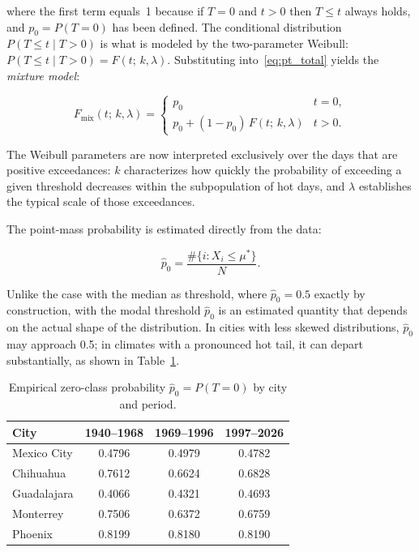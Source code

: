 \documentclass[APA,STIX1COL]{WileyNJD-v2}
\begin{document}
\medskip

where the first term equals~1 because if $T=0$ and $t>0$ then
$T\leq t$ always holds, and $p_0=P(T=0)$ has been defined. The
conditional distribution $P(T\leq t\mid T>0)$ is what is modeled
by the two-parameter Weibull: $P(T\leq t\mid T>0)=F(t;\,k,\lambda)$.
Substituting into~\eqref{eq:pt_total} yields the \emph{mixture
model}:

\begin{equation}\label{eq:mezcla}
F_{\mathrm{mix}}(t;\,k,\lambda)
  = \begin{cases}
    p_0 & t=0,\\[6pt]
    p_0 + (1-p_0)\,F(t;\,k,\lambda) & t>0.
    \end{cases}
\end{equation}

\medskip

The Weibull parameters are now interpreted exclusively over the
days that are positive exceedances: $k$ characterizes how quickly
the probability of exceeding a given threshold decreases within
the subpopulation of hot days, and $\lambda$ establishes the
typical scale of those exceedances.

\medskip

The point-mass probability is estimated directly from the data:

\begin{equation}\label{eq:p0}
\hat{p}_0
  = \frac{\#\{i : X_i\leq\mu^*\}}{N}.
\end{equation}

\medskip

Unlike the case with the median as threshold, where
$\hat{p}_0=0.5$ exactly by construction, with the modal
threshold $\hat{p}_0$ is an estimated quantity that depends on
the actual shape of the distribution. In cities with less
skewed distributions, $\hat{p}_0$ may approach 0.5; in climates
with a pronounced hot tail, it can depart substantially, as shown
in Table~\ref{tab:p0}.

\begin{table}[ht]
\centering
\begin{tabular}{lccc}
\toprule
City        & 1940--1968 & 1969--1996 & 1997--2026 \\
\midrule
Mexico City & 0.4796 & 0.4979 & 0.4782 \\
Chihuahua   & 0.7612 & 0.6624 & 0.6828 \\
Guadalajara & 0.4066 & 0.4321 & 0.4693 \\
Monterrey   & 0.7506 & 0.6372 & 0.6759 \\
Phoenix     & 0.8199 & 0.8180 & 0.8190 \\
\bottomrule
\end{tabular}
\caption{Empirical zero-class probability $\hat{p}_0=P(T=0)$
by city and period.}
\label{tab:p0}
\end{table}
\end{document}

